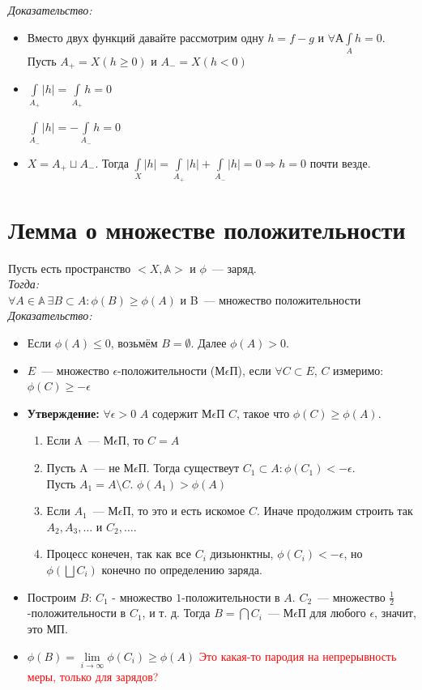 \documentclass[paper=a4, fontsize=17pt]{article}
\begin{document}
	\emph{Доказательство: }

		\begin{itemize}
			\item
			Вместо двух функций давайте рассмотрим одну $h = f - g$ и $\forall А \int\limits_A h = 0$. Пусть $A_{+} = X(h\geq 0)$ и $A_- = X(h < 0)$
			\item
			$\int\limits_{A_+} |h| = \int\limits_{A_+} h = 0$ \par
			$\int\limits_{A_-} |h| = -\int\limits_{A_-} h = 0$
			\item
			$X = A_+ \sqcup A_-$. Тогда $\int\limits_X |h| = \int\limits_{A_+} |h| + \int\limits_{A_-} |h| = 0 \Rightarrow h = 0$ почти везде.
		\end{itemize}
\section{Лемма о множестве положительности}
	Пусть есть пространство $<X, \mathbb{A}>$ и $\phi$~--- заряд.\\
	\emph{Тогда:}\\
		$\forall A\in \mathbb{A}\ \exists B \subset A : \phi(B) \geq \phi(A)$ и B~--- множество положительности \\
	\emph{Доказательство: }
		\begin{itemize}
			\item Если $\phi(A) \leq 0$, возьмём $B = \emptyset$. Далее $\phi(A) > 0$.
			\item $E$~--- множество $\epsilon$-положительности (М$\epsilon$П), если  $\forall C \subset E$, $C$ измеримо: $\phi(C) \geq -\epsilon$
			\item \textbf{Утверждение:} $\forall \epsilon>0$ $A$ содержит М$\epsilon$П $C$, такое что $\phi(C) \geq \phi(A)$.
			\begin{enumerate}
				\item Если A~--- М$\epsilon$П, то $C = A$
				\item Пусть A~--- не М$\epsilon$П. Тогда существеут $C_1 \subset A : \phi(C_1) < -\epsilon$.\\
                Пусть $A_1 = A \setminus C$. $\phi(A_1) > \phi(A)$\\
                \item Если $A_1$~--- М$\epsilon$П, то это и есть искомое $C$. Иначе продолжим строить так $A_2,A_3,\dots$ и $C_2,\dots$.
				\item Процесс конечен, так как все $C_i$ дизьюнктны, $\phi(C_i) < -\epsilon$, но $\phi(\bigsqcup C_i)$ конечно по определению заряда.
			\end{enumerate}
			\item Построим $B$: $C_1$ - множество $1$-положительности в $A$. $C_2$~--- множество $\frac{1}{2}$-положительности в $C_1$, и т. д.
                Тогда $B = \bigcap C_i$~--- М$\epsilon$П для любого $\epsilon$, значит, это МП.
			\item $\phi(B) = \lim\limits_{i \rightarrow \infty} \phi(C_i) \geq \phi(A)$
                \textcolor{red}{Это какая-то пародия на непрерывность меры, только для зарядов?}
		\end{itemize}
\end{document}
